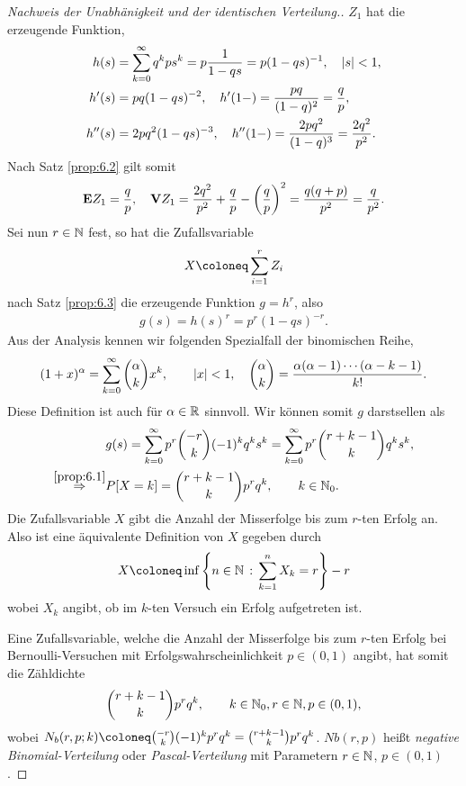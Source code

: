 \begin{bsp}
\begin{proof}[Nachweis der Unabhänigkeit und der identischen Verteilung.]
$Z_1$ hat die erzeugende Funktion,
\begin{align*}
h(s) &= \sum\limits_{k=0}^\infty q^kp s^k = p\frac{1}{1-qs} = p(1-qs)^{-1},\quad
\left|s\right|<1,\\
h'(s) &= pq(1-qs)^{-2},\quad h'(1-) = \frac{pq}{(1-q)^2} = \frac{q}{p},\\
h''(s) &= 2pq^2(1-qs)^{-3},\quad  h''(1-) = \frac{2pq^2}{(1-q)^3} =
\frac{2q^2}{p^2}.
\end{align*}
Nach Satz \ref{prop:6.2} gilt somit
\begin{align*}
\textbf{E} Z_1 = \frac{q}{p},\quad \textbf{V} Z_1 = \frac{2q^2}{p^2} + \frac{q}{p} -
\left(\frac{q}{p}\right)^2 = \frac{q(q+p)}{p^2} = \frac{q}{p^2}.
\end{align*}
Sei nun $r\in\mathbb{N}$ fest, so hat die Zufallsvariable
\begin{align*}
X\defl \sum\limits_{i=1}^r Z_i
\end{align*}
nach Satz \ref{prop:6.3} die erzeugende Funktion $g=h^r$, also 
\begin{align*}
g(s) = h(s)^r = p^r(1-qs)^{-r}.
\end{align*}
Aus der Analysis kennen wir folgenden Spezialfall der binomischen Reihe,
\begin{align*}
(1+x)^\alpha = \sum\limits_{k=0}^\infty \binom{\alpha}{k}x^k,\qquad \left|x\right|<
1,\quad \binom{\alpha}{k} = \frac{\alpha(\alpha-1)\cdots (\alpha-k-1)}{k!}.
\end{align*}
Diese Definition ist auch für $\alpha\in\mathbb{R}$ sinnvoll.
Wir können somit $g$ darstsellen als
\begin{align*}
&g(s) = \sum\limits_{k=0}^\infty p^r\binom{-r}{k}(-1)^k q^ks^k
= \sum\limits_{k=0}^\infty p^r\binom{r+k-1}{k} q^ks^k,\\
\overset{\ref{prop:6.1}}{\Rightarrow} & P[X=k] = \binom{r+k-1}{k}p^rq^k,\qquad
k\in\mathbb{N}_0.
\end{align*}
Die Zufallsvariable $X$ gibt die Anzahl der Misserfolge bis zum $r$-ten Erfolg
an. Also ist eine äquivalente Definition von $X$ gegeben durch
\begin{align*}
X\defl\inf \setdef{n\in\N}{\sum\limits_{k=1}^n X_k = r} - r
\end{align*}
wobei $X_k$ angibt, ob im $k$-ten Versuch ein Erfolg aufgetreten ist.

Eine Zufallsvariable, welche die Anzahl der Misserfolge bis zum $r$-ten Erfolg
bei Bernoulli-Versuchen mit Erfolgswahrscheinlichkeit $p\in (0,1)$ angibt, hat
somit die Zähldichte
\begin{align*}
\binom{r+k-1}{k}p^rq^k,\qquad k\in\mathbb{N}_0, r\in\mathbb{N}, p\in (0,1),
\end{align*}
wobei $N_b(r,p;k) \defl \binom{-r}{k}(-1)^kp^rq^k = \binom{r+k-1}{k}p^rq^k$.
$Nb(r,p)$ heißt \emph{negative Binomial-Verteilung} oder
\emph{Pascal-Verteilung} mit Parametern $r\in\mathbb{N}$, $p\in (0,1)$.


\end{proof}
\end{bsp}
